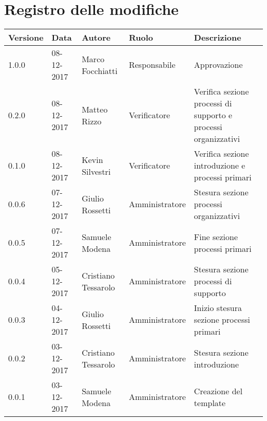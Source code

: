 \documentclass[./NormediProgetto.tex]{subfiles}
\begin{document}
\chapter*{Registro delle modifiche}
\setlength\LTleft{-22mm}
\begin{longtable}{|p{20mm}|p{20mm}|p{40mm}|p{30mm}|p{50mm}|}
	\hline
	\textbf{Versione} & \textbf{Data} & \textbf{Autore} & \textbf{Ruolo} & \textbf{Descrizione} \\ \hline 
		1.0.0 & 08-12-2017 & Marco Focchiatti & Responsabile & Approvazione\\ \hline
		0.2.0 & 08-12-2017 & Matteo Rizzo & Verificatore & Verifica sezione processi di supporto e processi organizzativi\\ \hline
		0.1.0 & 08-12-2017 & Kevin Silvestri & Verificatore & Verifica sezione introduzione e processi primari\\ \hline
		0.0.6 & 07-12-2017 & Giulio Rossetti & Amministratore & Stesura sezione processi organizzativi\\ \hline
		0.0.5 & 07-12-2017 & Samuele Modena & Amministratore & Fine sezione processi primari\\ \hline
		0.0.4 & 05-12-2017 & Cristiano Tessarolo & Amministratore & Stesura sezione processi di supporto\\ \hline
		0.0.3 & 04-12-2017 & Giulio Rossetti & Amministratore & Inizio stesura sezione processi primari\\ \hline
		0.0.2 & 03-12-2017 & Cristiano Tessarolo & Amministratore & Stesura sezione introduzione\\ \hline
		0.0.1 & 03-12-2017 & Samuele Modena & Amministratore & Creazione del template\\ \hline
\end{longtable}
\end{document}
